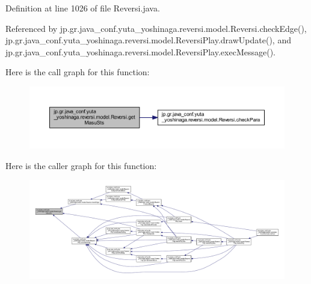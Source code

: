 Definition at line 1026 of file Reversi.\+java.



Referenced by jp.\+gr.\+java\+\_\+conf.\+yuta\+\_\+yoshinaga.\+reversi.\+model.\+Reversi.\+check\+Edge(), jp.\+gr.\+java\+\_\+conf.\+yuta\+\_\+yoshinaga.\+reversi.\+model.\+Reversi\+Play.\+draw\+Update(), and jp.\+gr.\+java\+\_\+conf.\+yuta\+\_\+yoshinaga.\+reversi.\+model.\+Reversi\+Play.\+exec\+Message().

Here is the call graph for this function\+:
\nopagebreak
\begin{figure}[H]
\begin{center}
\leavevmode
\includegraphics[width=350pt]{classjp_1_1gr_1_1java__conf_1_1yuta__yoshinaga_1_1reversi_1_1model_1_1_reversi_aaab64f3b70ed5da5f0707933cbf82802_cgraph}
\end{center}
\end{figure}
Here is the caller graph for this function\+:
\nopagebreak
\begin{figure}[H]
\begin{center}
\leavevmode
\includegraphics[width=350pt]{classjp_1_1gr_1_1java__conf_1_1yuta__yoshinaga_1_1reversi_1_1model_1_1_reversi_aaab64f3b70ed5da5f0707933cbf82802_icgraph}
\end{center}
\end{figure}
\mbox{\label{classjp_1_1gr_1_1java__conf_1_1yuta__yoshinaga_1_1reversi_1_1model_1_1_reversi_a1a528710342faba65975f4768d24b129}} 
